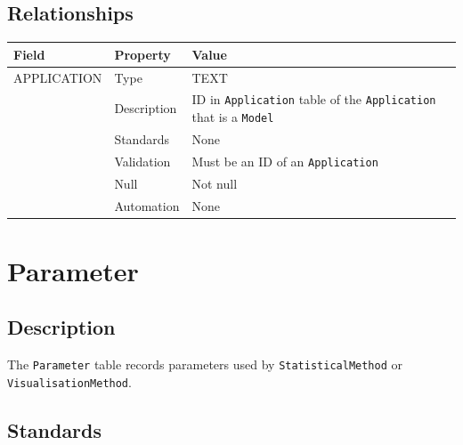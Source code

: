 \documentclass[
]{article}
\newcounter{none} %
\begin{document}
\subsection{Relationships}\label{relationships-16}

{\def\LTcaptype{none} %
\begin{longtable}[]{@{}
  >{\raggedright\arraybackslash}p{}
  >{\raggedright\arraybackslash}p{}
  >{\raggedright\arraybackslash}p{}@{}}
\toprule\noalign{}
\begin{minipage}[b]{\linewidth}\raggedright
Field
\end{minipage} & \begin{minipage}[b]{\linewidth}\raggedright
Property
\end{minipage} & \begin{minipage}[b]{\linewidth}\raggedright
Value
\end{minipage} \\
\midrule\noalign{}
\endhead
\bottomrule\noalign{}
\endlastfoot
APPLICATION & Type & TEXT \\
& Description & ID in \texttt{Application} table of the
\texttt{Application} that is a \texttt{Model} \\
& Standards & None \\
& Validation & Must be an ID of an \texttt{Application} \\
& Null & Not null \\
& Automation & None \\
\end{longtable}
}

\section{Parameter}\label{parameter}

\subsection{Description}\label{description-19}

The \texttt{Parameter} table records parameters used by
\texttt{StatisticalMethod} or \texttt{VisualisationMethod}.

\subsection{Standards}\label{standards-21}
\end{document}
